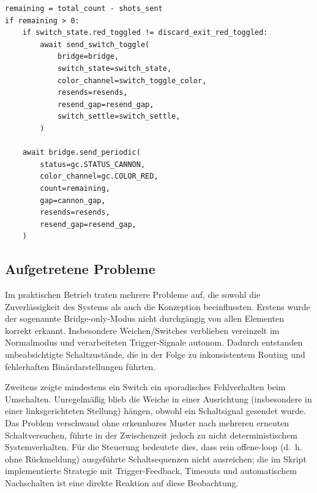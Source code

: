 \begin{listing}[ht]
\caption{Auszug: Discard-Phase nach vollständiger Keep-Bestätigung}
\label{lst:discard_phase}
\begin{verbatim}
remaining = total_count - shots_sent
if remaining > 0:
	if switch_state.red_toggled != discard_exit_red_toggled:
		await send_switch_toggle(
			bridge=bridge,
			switch_state=switch_state,
			color_channel=switch_toggle_color,
			resends=resends,
			resend_gap=resend_gap,
			switch_settle=switch_settle,
		)

	await bridge.send_periodic(
		status=gc.STATUS_CANNON,
		color_channel=gc.COLOR_RED,
		count=remaining,
		gap=cannon_gap,
		resends=resends,
		resend_gap=resend_gap,
	)
\end{verbatim}
\end{listing}


\subsection{Aufgetretene Probleme}

Im praktischen Betrieb traten mehrere Probleme auf, die sowohl die Zuverlässigkeit des Systems als auch die Konzeption beeinflussten. Erstens wurde der sogenannte Bridge-only-Modus nicht durchgängig von allen Elementen korrekt erkannt. Insbesondere Weichen/Switches verblieben vereinzelt im Normalmodus und verarbeiteten Trigger-Signale autonom. Dadurch entstanden unbeabsichtigte Schaltzustände, die in der Folge zu inkonsistentem Routing und fehlerhaften Binärdarstellungen führten.

Zweitens zeigte mindestens ein Switch ein sporadisches Fehlverhalten beim Umschalten. Unregelmäßig blieb die Weiche in einer Ausrichtung (insbesondere in einer linksgerichteten Stellung) hängen, obwohl ein Schaltsignal gesendet wurde. Das Problem verschwand ohne erkennbares Muster nach mehreren erneuten Schaltversuchen, führte in der Zwischenzeit jedoch zu nicht deterministischem Systemverhalten. Für die Steuerung bedeutete dies, dass rein offene-loop (d.~h. ohne Rückmeldung) ausgeführte Schaltsequenzen nicht ausreichen; die im Skript implementierte Strategie mit Trigger-Feedback, Timeouts und automatischem Nachschalten ist eine direkte Reaktion auf diese Beobachtung.

